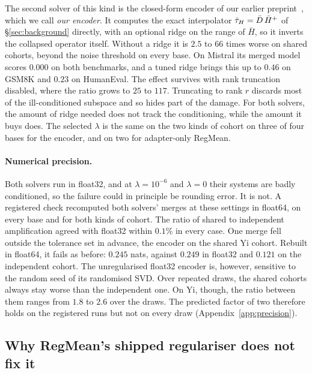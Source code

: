 The second solver of this kind is the closed-form encoder of our earlier
preprint~\citep{pathak2026rd}, which we call \emph{our encoder}. It computes
the exact interpolator $\bar{\tau}_H = \bar D\,\bar H^{+}$ of \S\ref{sec:background}
directly, with an optional ridge on the range of $\bar H$, so it inverts the
collapsed operator itself. Without a ridge it is $2.5$ to $66$ times worse on
shared cohorts, beyond the noise threshold on every base. On Mistral
its merged model scores $0.000$ on both benchmarks, and a tuned ridge brings
this up to $0.46$ on GSM8K and $0.23$ on HumanEval. The effect survives with
rank truncation disabled, where the ratio grows to $25$ to $117$. Truncating
to rank $r$ discards most of the ill-conditioned subspace and so hides part of
the damage. For both solvers, the amount of ridge needed does not track the
conditioning, while the amount it buys does. The selected $\lambda$ is the
same on the two kinds of cohort on three of four bases for the encoder, and on two for
adapter-only RegMean.

\paragraph{Numerical precision.} Both solvers run in float32, and at
$\lambda = 10^{-6}$ and $\lambda = 0$ their systems are badly conditioned,
so the failure could in principle be rounding error. It is not. A registered
check recomputed both solvers' merges at these settings in float64, on every
base and for both kinds of cohort. The ratio of shared to independent
amplification agreed with float32 within $0.1\%$ in every case. One merge
fell outside the tolerance set in advance, the encoder on the shared Yi
cohort. Rebuilt in float64, it fails as before: $0.245$ nats, against $0.249$
in float32 and $0.121$ on the independent cohort. The unregularised float32
encoder is, however, sensitive to the random seed of its randomised SVD. Over
repeated draws, the shared cohorts always stay worse than the independent
one. On Yi, though, the ratio between them ranges from $1.8$ to $2.6$ over the
draws. The predicted factor of two therefore holds on the registered runs but
not on every draw (Appendix~\ref{app:precision}).

\subsection{Why RegMean's shipped regulariser does not fix it}\label{subsec:default}

